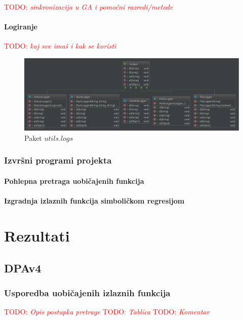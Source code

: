 \documentclass[times, utf8, numeric, diplomski]{fer}
\def\TODO#1{\noindent\textcolor{red}{TODO: \textit{#1}}\newline}
\def\todo#1{\TODO{#1}}
\begin{document}
\todo{sinkronizacija u GA i pomoćni razredi/metode}

\subsubsection{Logiranje}
\todo{kaj sve imaš i kak se koristi}

\begin{figure}[ht]
\includegraphics[width=\textwidth]{pkg_logs.pdf}
\centering
\caption{Paket $utils.logs$}
\label{fig:pkg_logs}
\end{figure}

\subsection{Izvršni programi projekta}
\subsubsection{Pohlepna pretraga uobičajenih funkcija}

\subsubsection{Izgradnja izlaznih funkcija simboličkom regresijom}

\chapter{Rezultati}
\label{sec:rezultati}

\section{DPAv4}

\subsection{Usporedba uobičajenih izlaznih funkcija}
\todo{Opis postupka pretrage}
\todo{Tablica}
\todo{Komentar}
\end{document}
